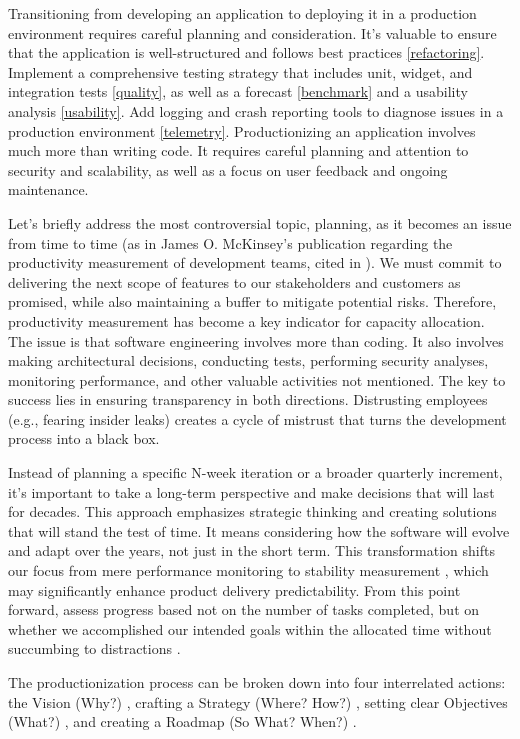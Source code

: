 

Transitioning from developing an application to deploying it in a production environment requires careful planning and 
consideration. It's valuable to ensure that the application is well-structured and follows best practices 
\ref{refactoring}. Implement a comprehensive testing strategy that includes unit, widget, and integration tests 
\ref{quality}, as well as a forecast \ref{benchmark} and a usability analysis \ref{usability}. Add logging and crash 
reporting tools to diagnose issues in a production environment \ref{telemetry}. Productionizing an application involves 
much more than writing code. It requires careful planning and attention to security and scalability, as well as a focus 
on user feedback and ongoing maintenance. 

Let's briefly address the most controversial topic, planning, as it becomes an issue from time to time (as in James O. 
McKinsey's publication regarding the productivity measurement of development teams, cited in \cite{McKi23}). We must 
commit to delivering the next scope of features to our stakeholders and customers as promised, while also maintaining a 
buffer to mitigate potential risks. Therefore, productivity measurement has become a key indicator for capacity 
allocation. The issue is that software engineering involves more than coding. It also involves making architectural 
decisions, conducting tests, performing security analyses, monitoring performance, and other valuable activities not 
mentioned. The key to success lies in ensuring transparency in both directions. Distrusting employees (e.g., fearing 
insider leaks) creates a cycle of mistrust that turns the development process into a black box. 

Instead of planning a specific N-week iteration or a broader quarterly increment, it's important to take a long-term 
perspective and make decisions that will last for decades. This approach emphasizes strategic thinking and creating 
solutions that will stand the test of time. It means considering how the software will evolve and adapt over the years, 
not just in the short term. This transformation shifts our focus from mere performance monitoring to stability 
measurement \cite{Heal23}, which may significantly enhance product delivery predictability. From this point forward, 
assess progress based not on the number of tasks completed, but on whether we accomplished our intended goals within the 
allocated time without succumbing to distractions \cite{Eyal20}.

The productionization process can be broken down into four interrelated actions: the Vision (Why?) \cite{Wall19}, crafting a Strategy (Where? How?) \cite{Lafl13}, setting clear Objectives (What?) \cite{Doer18}, and creating a Roadmap (So What? When?) \cite{Lomb17}.
